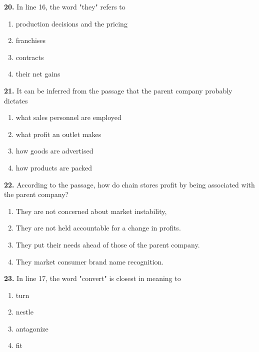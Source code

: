 \documentclass[12pt]{article}
\begin{document}
\par
\vspace{0.25\baselineskip}
\noindent\textbf{20.} In line 16, the word "they" refers to
\begin{enumerate}[label=(\Alph*),leftmargin=*,itemsep=0.2em]
\item production decisions and the pricing
\item franchises
\item contracts
\item their net gains
\end{enumerate}
\par
\vspace{0.25\baselineskip}
\noindent\textbf{21.} It can be inferred from the passage that the parent company probably dictates
\begin{enumerate}[label=(\Alph*),leftmargin=*,itemsep=0.2em]
\item what sales personnel are employed
\item what profit an outlet makes
\item how goods are advertised
\item how products are packed
\end{enumerate}
\par
\vspace{0.25\baselineskip}
\noindent\textbf{22.} According to the passage, how do chain stores profit by being associated with the parent company?
\begin{enumerate}[label=(\Alph*),leftmargin=*,itemsep=0.2em]
\item They are not concerned about market instability,
\item They are not held accountable for a change in profits.
\item They put their needs ahead of those of the parent company.
\item They market consumer brand name recognition.
\end{enumerate}
\par
\vspace{0.25\baselineskip}
\noindent\textbf{23.} In line 17, the word "convert" is closest in meaning to
\begin{enumerate}[label=(\Alph*),leftmargin=*,itemsep=0.2em]
\item turn
\item nestle
\item antagonize
\item fit
\end{enumerate}
\par
\vspace{0.25\baselineskip}
\end{document}
